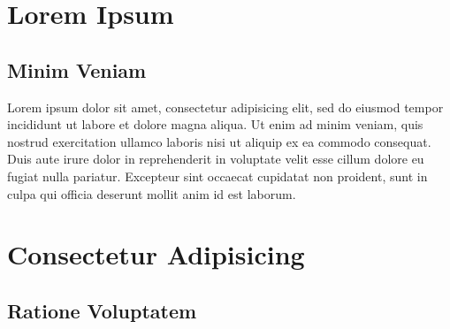 \documentclass[a4paper,11pt,twoside,onecolumn,final,openright]{book}
\begin{document}


\pagestyle{headings}




\part{Lorem Ipsum}
\thispagestyle{empty}
\chapter*{Minim Veniam}
\thispagestyle{empty}

Lorem ipsum dolor sit amet, consectetur adipisicing elit, sed do eiusmod tempor incididunt ut labore et dolore magna aliqua. Ut enim ad minim veniam, quis nostrud exercitation ullamco laboris nisi ut aliquip ex ea commodo consequat. Duis aute irure dolor in reprehenderit in voluptate velit esse cillum dolore eu fugiat nulla pariatur. Excepteur sint occaecat cupidatat non proident, sunt in culpa qui officia deserunt mollit anim id est laborum.

\newpage
\thispagestyle{empty}



\part{Consectetur Adipisicing}
\thispagestyle{empty}
\chapter*{Ratione Voluptatem}
\thispagestyle{empty}
\end{document}
